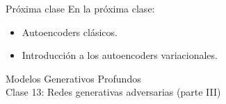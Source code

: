 \documentclass{beamer}
\begin{document}
\begin{frame}{Próxima clase}
    En la próxima clase:
    \begin{itemize}
        \item Autoencoders clásicos.
        \item Introducción a los autoencoders variacionales.
    \end{itemize}
\end{frame}

\begin{frame}
    \centering
    \Large{Modelos Generativos Profundos}\\
    \large{Clase 13: Redes generativas adversarias (parte III)}
\end{frame}
\end{document}
